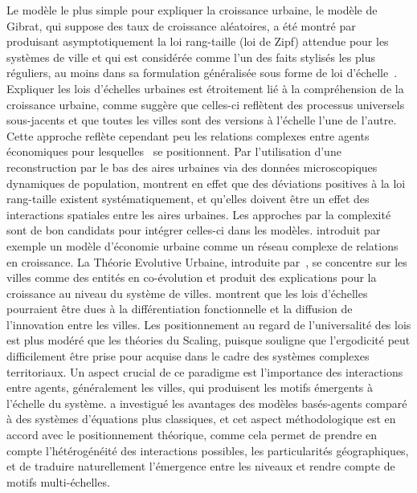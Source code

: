 {Le modèle le plus simple pour expliquer la croissance urbaine, le modèle de Gibrat, qui suppose des taux de croissance aléatoires, a été montré par~\cite{gabaix1999zipf} produisant asymptotiquement la loi rang-taille (loi de Zipf) attendue pour les systèmes de ville et qui est considérée comme l'un des faits stylisés les plus réguliers, au moins dans sa formulation généralisée sous forme de loi d'échelle~\cite{nitsch2005zipf}. Expliquer les lois d'échelles urbaines est étroitement lié à la compréhension de la croissance urbaine, comme \cite{bettencourt2008large} suggère que celles-ci reflètent des processus universels sous-jacents et que toutes les villes sont des versions à l'échelle l'une de l'autre. Cette approche reflète cependant peu les relations complexes entre agents économiques pour lesquelles~\cite{storper2009rethinking} se positionnent. Par l'utilisation d'une reconstruction par le bas des aires urbaines via des données microscopiques dynamiques de population, \cite{rozenfeld2008laws} montrent en effet que des déviations positives à la loi rang-taille existent systématiquement, et qu'elles doivent être un effet des interactions spatiales entre les aires urbaines. Les approches par la complexité sont de bon candidats pour intégrer celles-ci dans les modèles. \cite{andersson2006complex} introduit par exemple un modèle d'économie urbaine comme un réseau complexe de relations en croissance. La Théorie Evolutive Urbaine, introduite par~\cite{pumain1997pour}, se concentre sur les villes comme des entités en co-évolution et produit des explications pour la croissance au niveau du système de villes. \cite{pumain2006evolutionary} montrent que les lois d'échelles pourraient être dues à la différentiation fonctionnelle et la diffusion de l'innovation entre les villes. Les positionnement au regard de l'universalité des lois est plus modéré que les théories du Scaling, puisque \cite{pumain2012urban} souligne que l'ergodicité peut difficilement être prise pour acquise dans le cadre des systèmes complexes territoriaux. Un aspect crucial de ce paradigme est l'importance des interactions entre agents, généralement les villes, qui produisent les motifs émergents à l'échelle du système. \cite{pumain2013theoretical} a investigué les avantages des modèles basés-agents comparé à des systèmes d'équations plus classiques, et cet aspect méthodologique est en accord avec le positionnement théorique, comme cela permet de prendre en compte l'hétérogénéité des interactions possibles, les particularités géographiques, et de traduire naturellement l'émergence entre les niveaux et rendre compte de motifs multi-échelles.
}


